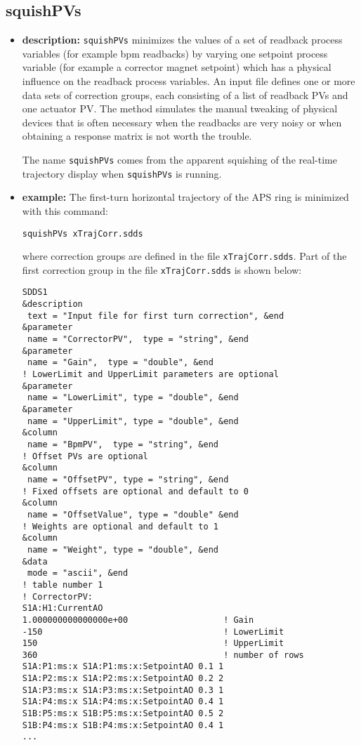 %
%
\begin{latexonly}
\newpage
\end{latexonly}
%
%
\subsection{squishPVs}
\label{squishPVs}

\begin{itemize}
\item {\bf description:}
%
%
\verb+squishPVs+ minimizes the values of a set of readback process 
variables (for example bpm readbacks) by varying one setpoint process 
variable (for example a corrector magnet setpoint) which has
a physical influence on the readback process variables. 
An input file defines one or more data sets of correction groups, each
consisting of a list of readback PVs and one actuator PV. 
The method simulates the manual tweaking of physical devices that is often necessary
when the readbacks are very noisy or when obtaining a response matrix is not
worth the trouble.

The name \verb+squishPVs+ comes from the apparent squishing of the real-time
trajectory display when \verb+squishPVs+ is running.
\item {\bf example:} 
%
% 
%
The first-turn horizontal trajectory of the APS ring is minimized with this command:
\begin{verbatim}
squishPVs xTrajCorr.sdds 
\end{verbatim}
where correction groups are defined in the file \verb+xTrajCorr.sdds+.
Part of the first correction group in the file \verb+xTrajCorr.sdds+
is shown below:
\begin{verbatim}
SDDS1
&description
 text = "Input file for first turn correction", &end
&parameter
 name = "CorrectorPV",  type = "string", &end
&parameter
 name = "Gain",  type = "double", &end
! LowerLimit and UpperLimit parameters are optional
&parameter 
 name = "LowerLimit", type = "double", &end
&parameter 
 name = "UpperLimit", type = "double", &end
&column
 name = "BpmPV",  type = "string", &end
! Offset PVs are optional
&column
 name = "OffsetPV", type = "string", &end
! Fixed offsets are optional and default to 0
&column
 name = "OffsetValue", type = "double" &end
! Weights are optional and default to 1
&column 
 name = "Weight", type = "double", &end
&data
 mode = "ascii", &end
! table number 1
! CorrectorPV: 
S1A:H1:CurrentAO
1.000000000000000e+00                   ! Gain
-150                                    ! LowerLimit
150                                     ! UpperLimit
360                                     ! number of rows
S1A:P1:ms:x S1A:P1:ms:x:SetpointAO 0.1 1
S1A:P2:ms:x S1A:P2:ms:x:SetpointAO 0.2 2
S1A:P3:ms:x S1A:P3:ms:x:SetpointAO 0.3 1
S1A:P4:ms:x S1A:P4:ms:x:SetpointAO 0.4 1
S1B:P5:ms:x S1B:P5:ms:x:SetpointAO 0.5 2
S1B:P4:ms:x S1B:P4:ms:x:SetpointAO 0.4 1
...
\end{verbatim}



\end{itemize}
